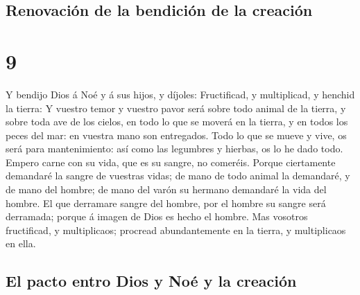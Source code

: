 \hypertarget{renovaciuxf3n-de-la-bendiciuxf3n-de-la-creaciuxf3n}{%
\subsection{Renovación de la bendición de la
creación}\label{renovaciuxf3n-de-la-bendiciuxf3n-de-la-creaciuxf3n}}

\hypertarget{section-01-9}{%
\section{9}\label{section-01-9}}

 Y bendijo Dios á Noé y á sus hijos, y díjoles:
Fructificad, y multiplicad, y henchid la tierra:  Y
vuestro temor y vuestro pavor será sobre todo animal de la tierra, y
sobre toda ave de los cielos, en todo lo que se moverá en la tierra, y
en todos los peces del mar: en vuestra mano son entregados.
 Todo lo que se mueve y vive, os será para mantenimiento:
así como las legumbres y hierbas, os lo he dado todo. 
Empero carne con su vida, que es su sangre, no comeréis. 
Porque ciertamente demandaré la sangre de vuestras vidas; de mano de
todo animal la demandaré, y de mano del hombre; de mano del varón su
hermano demandaré la vida del hombre.  El que derramare
sangre del hombre, por el hombre su sangre será derramada; porque á
imagen de Dios es hecho el hombre.  Mas vosotros
fructificad, y multiplicaos; procread abundantemente en la tierra, y
multiplicaos en ella.

\hypertarget{el-pacto-entro-dios-y-nouxe9-y-la-creaciuxf3n}{%
\subsection{El pacto entro Dios y Noé y la
creación}\label{el-pacto-entro-dios-y-nouxe9-y-la-creaciuxf3n}}

